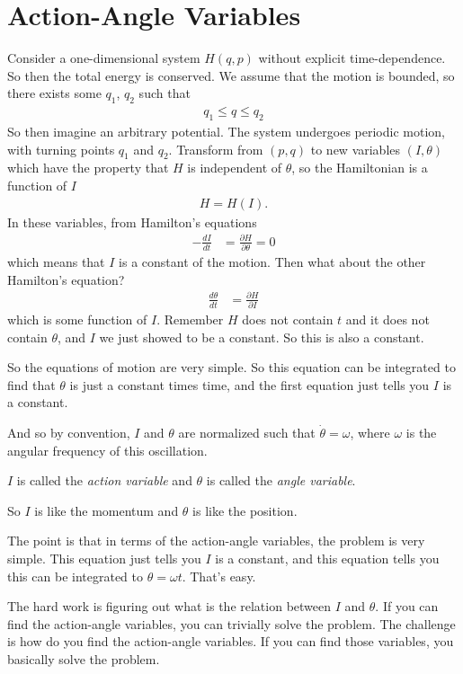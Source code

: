\section{Action-Angle Variables}
Consider a one-dimensional system $H(q, p)$
without explicit time-dependence.
So then the total energy is conserved.
We assume that the motion is bounded,
so there exists some $q_1$, $q_2$ such that
\begin{align}
    q_1 \le q \le q_2
\end{align}
So then imagine an arbitrary potential.
The system undergoes periodic motion,
with turning points $q_1$ and $q_2$.
Transform from
$(p, q)$
to new variables
$(I, \theta)$
which have the property that $H$ is independent of $\theta$,
so the Hamiltonian is a function of $I$
\begin{align}
    H = H(I).
\end{align}
In these variables,
from Hamilton's equations
\begin{align}
    -\frac{dI}{dt} &= \frac{\partial H}{\partial \theta} = 0
\end{align}
which means that $I$ is a constant of the motion.
Then what about the other Hamilton's equation?
\begin{align}
    \frac{d\theta}{dt} &=
    \frac{\partial H}{\partial I}
\end{align}
which is some function of $I$.
Remember $H$ does not contain $t$ and it does not contain $\theta$,
and $I$ we just showed to be a constant.
So this is also a constant.

So the equations of motion are very simple.
So this equation can be integrated to find that $\theta$ is just a constant
times time,
and the first equation just tells you $I$ is a constant.

And so by convention,
$I$ and $\theta$ are normalized such that
$\dot{\theta} = \omega$,
where $\omega$ is the angular frequency of this oscillation.

$I$ is called the \emph{action variable}
and $\theta$ is called the \emph{angle variable}.

So $I$ is like the momentum and $\theta$ is like the position.

The point is that in terms of the action-angle variables,
the problem is very simple.
This equation just tells you $I$ is a constant,
and this equation tells you this can be integrated to $\theta=\omega t$.
That's easy.

The hard work is figuring out what is the relation between $I$ and $\theta$.
If you can find the action-angle variables,
you can trivially solve the problem.
The challenge is how do you find the action-angle variables.
If you can find those variables,
you basically solve the problem.

